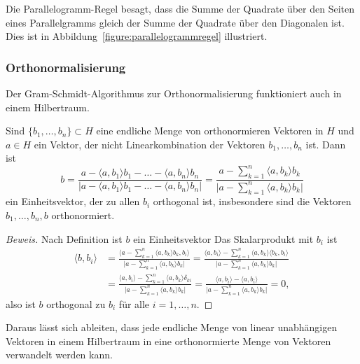 Die Parallelogramm-Regel besagt, dass die Summe der Quadrate über den
Seiten eines Parallelgramms gleich der Summe der Quadrate über den
Diagonalen ist.
Dies ist in Abbildung~\ref{figure:parallelogrammregel} illustriert.

\subsubsection{Orthonormalisierung}
%
Der Gram-Schmidt-Algorithmus zur Orthonormalisierung funktioniert auch
%
in einem Hilbertraum.

\begin{satz}
\label{satz:orthonormierung}
Sind $\{b_1,\dots,b_n\}\subset H$ eine endliche Menge von orthonormieren
Vektoren in $H$ und $a\in H$ ein Vektor, der nicht Linearkombination
der Vektoren $b_1,\dots,b_n$ ist.
Dann ist
\[
b
=
\frac{a-\langle a,b_1\rangle b_1-\dots-\langle a,b_n\rangle b_n}%
{|a-\langle a,b_1\rangle b_1-\dots-\langle a,b_n\rangle b_n|}
=
\frac{a-\displaystyle\sum_{k=1}^n \langle a,b_k\rangle b_k}%
{\biggl| a-\displaystyle\sum_{k=1}^n \langle a,b_k\rangle b_k\biggr|}
\]
ein Einheitsvektor, der zu allen $b_i$ orthogonal ist, insbesondere sind
die Vektoren
$b_1,\dots,b_n,b$ orthonormiert.
\end{satz}

\begin{proof}[Beweis]
Nach Definition ist $b$ ein Einheitsvektor
Das Skalarprodukt mit $b_i$ ist
\begin{align*}
\langle b, b_i\rangle
&=
\frac{\biggl\langle a-\displaystyle\sum_{k=1}^n \langle a,b_k\rangle b_k,b_i\biggr\rangle}%
{\biggl| a-\displaystyle\sum_{k=1}^n \langle a,b_k\rangle b_k\biggr|}
=
\frac{\langle a,b_i\rangle-\displaystyle\sum_{k=1}^n \langle a,b_k\rangle \langle b_k,b_i\rangle}%
{\biggl| a-\displaystyle\sum_{k=1}^n \langle a,b_k\rangle b_k\biggr|}
\\
&=
\frac{\langle a,b_i\rangle-\displaystyle\sum_{k=1}^n \langle a,b_k\rangle \delta_{ki}}%
{\biggl| a-\displaystyle\sum_{k=1}^n \langle a,b_k\rangle b_k\biggr|}
=
\frac{\langle a,b_i\rangle-\langle a,b_i\rangle}%
{\biggl| a-\displaystyle\sum_{k=1}^n \langle a,b_k\rangle b_k\biggr|}
=0,
\end{align*}
also ist $b$ orthogonal zu $b_i$ für alle $i=1,\dots,n$.
\end{proof}

Daraus lässt sich ableiten, dass jede endliche Menge von linear unabhängigen
Vektoren in einem Hilbertraum in eine orthonormierte Menge von Vektoren
verwandelt werden kann.

